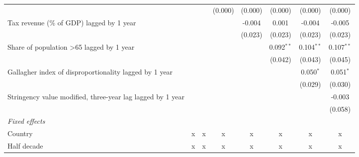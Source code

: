 \begin{tabular}{lccccccc}
                                                                                    &              &               & (0.000)       & (0.000)       & (0.000)      & (0.000)      & (0.000)\\   
   Tax revenue (\% of GDP) lagged by 1 year                                         &              &               &               & -0.004        & 0.001        & -0.004       & -0.005\\   
                                                                                    &              &               &               & (0.023)       & (0.023)      & (0.023)      & (0.023)\\   
   Share of population >65 lagged by 1 year                                         &              &               &               &               & 0.092$^{**}$ & 0.104$^{**}$ & 0.107$^{**}$\\   
                                                                                    &              &               &               &               & (0.042)      & (0.043)      & (0.045)\\   
   Gallagher index of disproportionality lagged by 1 year                           &              &               &               &               &              & 0.050$^{*}$  & 0.051$^{*}$\\   
                                                                                    &              &               &               &               &              & (0.029)      & (0.030)\\   
   Stringency value modified, three-year lag lagged by 1 year                       &              &               &               &               &              &              & -0.003\\   
                                                                                    &              &               &               &               &              &              & (0.058)\\   
   \emph{Fixed effects}\\
   Country                                                                          & x            & x             & x             & x             & x            & x            & x\\  
   Half decade                                                                      & x            & x             & x             & x             & x            & x            & x\\  

\end{tabular}
